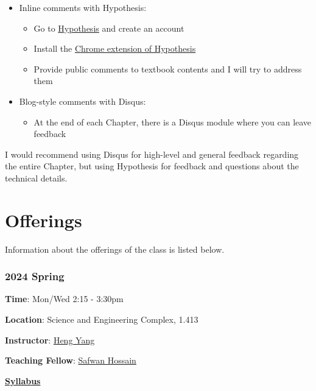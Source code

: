 \documentclass[
]{book}
\providecommand{\tightlist}{%
  \setlength{\itemsep}{0pt}\setlength{\parskip}{0pt}}
\theoremstyle{definition}
\theoremstyle{definition}
\theoremstyle{definition}
\theoremstyle{definition}
\theoremstyle{remark}
\begin{document}
\begin{itemize}
\tightlist
\item
  Inline comments with Hypothesis:

  \begin{itemize}
  \tightlist
  \item
    Go to \href{https://hypothes.is}{Hypothesis} and create an account
  \item
    Install the \href{https://chrome.google.com/webstore/detail/hypothesis-web-pdf-annota/bjfhmglciegochdpefhhlphglcehbmek}{Chrome extension of Hypothesis}
  \item
    Provide public comments to textbook contents and I will try to address them
  \end{itemize}
\item
  Blog-style comments with Disqus:

  \begin{itemize}
  \tightlist
  \item
    At the end of each Chapter, there is a Disqus module where you can leave feedback
  \end{itemize}
\end{itemize}

I would recommend using Disqus for high-level and general feedback regarding the entire Chapter, but using Hypothesis for feedback and questions about the technical details.

\section*{Offerings}\label{offerings}

Information about the offerings of the class is listed below.

\subsubsection*{2024 Spring}\label{spring}

\textbf{Time}: Mon/Wed 2:15 - 3:30pm

\textbf{Location}: Science and Engineering Complex, 1.413

\textbf{Instructor}: \href{https://hankyang.seas.harvard.edu/}{Heng Yang}

\textbf{Teaching Fellow}: \href{https://safwanhossain.github.io/}{Safwan Hossain}

\href{https://docs.google.com/document/d/1H6Wqht_PVw_n8Jl0kXN3HjZfHkeZJYqYWT4ayxvqRlU/edit?usp=sharing}{\textbf{Syllabus}}
\end{document}
